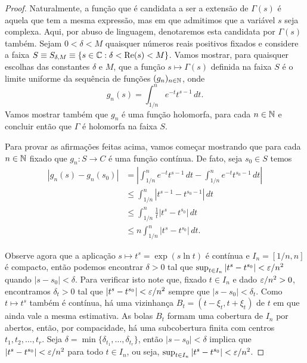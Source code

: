     \begin{proof}
        Naturalmente, a função que é candidata a ser a extensão de $\Gamma(s)$ 
        é aquela que tem a mesma expressão, mas em que admitimos que a variável $s$ seja complexa.
        Aqui, por abuso de linguagem, denotaremos esta candidata por $\Gamma(s)$ também. Sejam 
        $
        0 < \delta < M$ quaisquer números reais positivos fixados e 
        considere a faixa $S\equiv  S_{\delta, M} 
        \equiv 
        \{ s \in \mathbb{C} : \delta < \mathrm{Re}(s) < M\}$. 
        Vamos mostrar, para quaisquer escolhas das constantes $\delta$ e $M$, que a função $s\longmapsto\Gamma(s)$ definida na faixa $S$ é o limite uniforme da sequência de funções $(g_n)_{n\in \mathbb{N}}$, onde
        \[
        g_n(s) = \int_{1/n}^{n}e^{-t}t^{s-1} \, dt.
        \]
        Vamos mostrar também que $g_n$ é uma função holomorfa,
        para cada $n\in \mathbb{N}$ e concluir então que $\Gamma$ é holomorfa na faixa $S$. 
        
        Para provar as afirmações feitas acima, vamos começar mostrando que para cada $n\in \mathbb{N}$ fixado que $g_n:S\to C$ é uma função contínua. De fato, seja $s_0 \in S$ temos  
        \begin{align*}
            |g_n(s)-g_n(s_0)|
            &=
            \left|
            \int_{1/n}^{n}e^{-t}t^{s-1} \, dt
            -
            \int_{1/n}^{n}e^{-t}t^{s_0-1} \, dt
            \right|
            \\[0.3cm]
            &\leqslant
            \int_{1/n}^{n} |t^{s-1}-t^{s_0-1}| \, dt
            \\[0.3cm]
            &\leqslant
            \int_{1/n}^{n}
            \frac{1}{t} |t^{s}-t^{s_0}|            
            \, dt
            \\[0.3cm]
            &\leqslant
            n
            \int_{1/n}^{n}
            |t^s-t^{s_0}| \, dt.
        \end{align*}
    
    Observe agora que a aplicação $s \mapsto t^s = \exp(s\ln t)$ é contínua e $ I_n = [1/n, n]$ é compacto, então podemos encontrar $\delta > 0$ tal que $\sup_{t \in I_n} |t^s-t^{s_0}| < \varepsilon/n^2$ quando $|s - s_0| < \delta$. Para verificar isto note que, fixado $t \in I_n$ e dado $\varepsilon/n^2 > 0$, encontramos $\delta_t > 0$ tal que $|t^s - t^{s_0}| < \varepsilon/n^2$ sempre que $|s - s_0| < \delta_t$. Como $t \mapsto t^s$ também é contínua, há uma vizinhança $B_t = (t-\xi_t, t+ \xi_t)$ de $t$ em que ainda vale a mesma estimativa. As bolas $B_t$ formam uma cobertura de $I_n$ por abertos, então, por compacidade, há uma subcobertura finita com centros $t_1, t_2, \dots, t_r$. Seja $\delta = \min\{\delta_{t_1}, \dots, \delta_{t_r}\}$, então $|s - s_0| < \delta$ implica que $|t^s-t^{s_0}| < \varepsilon/n^2$ para todo $t \in I_n$, ou seja, $\sup_{t \in I_n} |t^s-t^{s_0}| < \varepsilon/n^2$. 
    

\end{proof}
